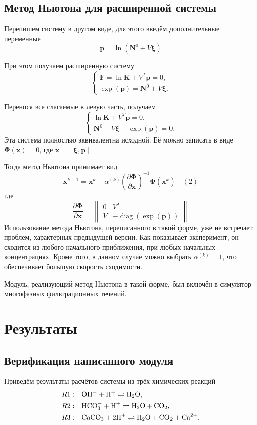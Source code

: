 \documentclass[14pt,a4paper]{extarticle}
\newcommand{\pd}[2]{\frac{\partial #1}{\partial #2}}
\newcommand{\diag}{\operatorname{diag}}
\renewcommand{\vec}[1]{\boldsymbol{\mathbf{#1}}}
\begin{document}
\subsection{Метод Ньютона для расширенной системы}

Перепишем систему в другом виде, для этого введём дополнительные переменные $$\vec{p} = \ln{(\vec{N}^0 + V\vec{\xi})}$$ 

При этом получаем расширенную систему
$$\begin{cases} 
	\vec{F} = \ln{\vec{K}} + V^T\vec{p}=0,\\
	\exp(\vec{p})=\vec{N}^0 + V\vec{\xi}.
	
\end{cases}$$

Перенося все слагаемые в левую часть, получаем
$$\begin{cases} 
	\ln{\vec{K}} + V^T\vec{p}=0,\\
	\vec{N}^0 + V\vec{\xi} - \exp(\vec{p}) = 0.
\end{cases}$$
Эта система полностью эквивалентна исходной. Её можно записать в виде
$\vec{\Phi}(\vec{x}) = 0$, где $ \vec{x} = [\vec{\xi}, \vec{p}]$

Тогда метод Ньютона принимает вид\\
$$\vec{x}^{k+1} = \vec{x}^{k} - \alpha^{(k)}\left(\pd{\vec{\Phi}}{\vec{x}}\right)^{-1}\vec{\Phi}(\vec x^k) \quad (2)$$
 где $$\pd{\vec{\Phi}}{\vec{x}} = \begin{Vmatrix}
 0 & V^T \\
 V & -\diag({\exp(\vec{p})})
\end{Vmatrix}  $$
Использование метода Ньютона, переписанного в такой форме, уже не встречает проблем, характерных предыдущей версии. Как показывает эксперимент, он сходится из любого начального приближения, при любых начальных концентрациях. Кроме того, в данном случае можно выбрать $\alpha^{(k)} = 1$, что обеспечивает большую скорость сходимости.

Модуль, реализующий метод Ньютона в такой форме, был включён в симулятор многофазных фильтрационных течений. 

\clearpage
\section{Результаты}
\subsection{Верификация написанного модуля}
Приведём результаты расчётов системы из трёх химических реакций 
\begin{align*}
R1:&\quad \text{OH}^- + \text{H}^+ \rightleftharpoons \text{H}_2\text{O},\\
R2:&\quad \text{HCO}_3^{-} +\text{H}^+ \rightleftharpoons \text{H}_2\text{O} + \text{CO}_2,\\
R3:&\quad \text{CaCO}_3 + 2\text{H}^+ \rightleftharpoons \text{H}_2\text{O} + \text{CO}_2 + \text{Ca}^{2+}.
\end{align*}
\end{document}
